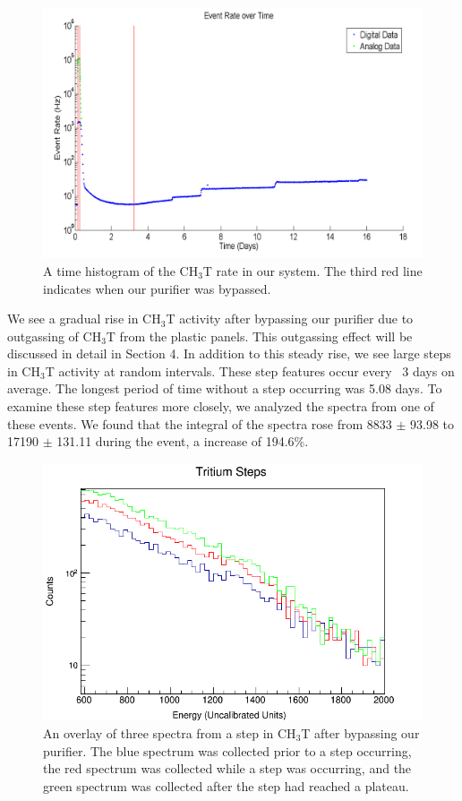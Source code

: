 \begin{figure}[h]
\centering
\includegraphics[scale=0.2]{Outgassing_TimeHisto_Log.png}
\caption{A time histogram of the CH$_3$T rate in our system.  The third red line indicates when our purifier was bypassed.}
\label{fig:OutGas}
\end{figure}

We see a gradual rise in CH$_3$T activity after bypassing our purifier due to outgassing of CH$_3$T from the plastic panels.  This outgassing effect will be discussed in detail in Section 4. In addition to this steady rise, we see large steps in CH$_3$T activity at random intervals.  These step features occur every ~3 days on average.  The longest period of time without a step occurring was 5.08 days. To examine these step features more closely, we analyzed the spectra from one of these events.  We found that the integral of the spectra rose from 8833 $\pm$ 93.98 to 17190 $\pm$ 131.11 during the event, a increase of 194.6\%. 

\begin{figure}[h]
\centering
\includegraphics[scale=0.25]{Steps_Overlay.png}
\caption{An overlay of three spectra from a step in CH$_3$T after bypassing our purifier.  The blue spectrum was collected prior to a step occurring, the red spectrum was collected while a step was occurring, and the green spectrum was collected after the step had reached a plateau.}
\label{fig:Steps}
\end{figure}

